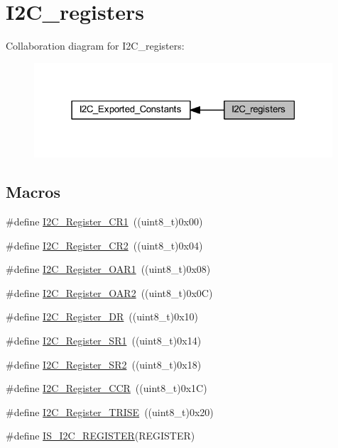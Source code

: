\hypertarget{group___i2_c__registers}{}\section{I2\+C\+\_\+registers}
\label{group___i2_c__registers}
Collaboration diagram for I2\+C\+\_\+registers\+:
\nopagebreak
\begin{figure}[H]
\begin{center}
\leavevmode
\includegraphics[width=315pt]{group___i2_c__registers}
\end{center}
\end{figure}
\subsection*{Macros}
\begin{DoxyCompactItemize}
\item 
\#define \hyperlink{group___i2_c__registers_ga4b9e7934e490c3540e50cf2f1d0a7688}{I2\+C\+\_\+\+Register\+\_\+\+C\+R1}~((uint8\+\_\+t)0x00)
\item 
\#define \hyperlink{group___i2_c__registers_gaf278337dd03b6ae56eac3f335381eca3}{I2\+C\+\_\+\+Register\+\_\+\+C\+R2}~((uint8\+\_\+t)0x04)
\item 
\#define \hyperlink{group___i2_c__registers_ga706317a00c0d450e95c00efd2afe1836}{I2\+C\+\_\+\+Register\+\_\+\+O\+A\+R1}~((uint8\+\_\+t)0x08)
\item 
\#define \hyperlink{group___i2_c__registers_gaffdc1902493456dea95216a39fc54e2b}{I2\+C\+\_\+\+Register\+\_\+\+O\+A\+R2}~((uint8\+\_\+t)0x0\+C)
\item 
\#define \hyperlink{group___i2_c__registers_gaea281721e7a8461d90bf59898487c096}{I2\+C\+\_\+\+Register\+\_\+\+DR}~((uint8\+\_\+t)0x10)
\item 
\#define \hyperlink{group___i2_c__registers_gaf3bc5f4dc87513e2eceba4f503c14d6a}{I2\+C\+\_\+\+Register\+\_\+\+S\+R1}~((uint8\+\_\+t)0x14)
\item 
\#define \hyperlink{group___i2_c__registers_ga0b5f7949e449223ec97e0169d79d007d}{I2\+C\+\_\+\+Register\+\_\+\+S\+R2}~((uint8\+\_\+t)0x18)
\item 
\#define \hyperlink{group___i2_c__registers_ga7a0de765650408f3915b54141f052c5b}{I2\+C\+\_\+\+Register\+\_\+\+C\+CR}~((uint8\+\_\+t)0x1\+C)
\item 
\#define \hyperlink{group___i2_c__registers_ga488c25a0a9f2c572af28768589fcbab2}{I2\+C\+\_\+\+Register\+\_\+\+T\+R\+I\+SE}~((uint8\+\_\+t)0x20)
\item 
\#define \hyperlink{group___i2_c__registers_ga37206b258f7930065c308ec7d35f243e}{I\+S\+\_\+\+I2\+C\+\_\+\+R\+E\+G\+I\+S\+T\+ER}(R\+E\+G\+I\+S\+T\+ER)
\end{DoxyCompactItemize}


